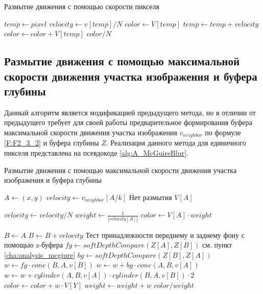 \begin{breakablealgorithm}
    \caption{Размытие движения с помощью скорости пикселя} \label{alg:A_PerPixelBlur}
    \begin{algorithmic}[1]
            \State $temp \leftarrow pixel$
            \State $velocity \leftarrow v[temp] / N$
            \State $color \leftarrow V[temp]$
            \ForAll{$i \in [0; N)$}
                \State $temp \leftarrow temp + velocity$
                \State $color \leftarrow color + V[temp]$
            \EndFor
            \State \Return $color / N$
        \EndFunction
\end{algorithmic}
\end{breakablealgorithm}




\subsection{Размытие движения с помощью максимальной скорости движения участка изображения и буфера глубины}

Данный алгоритм является модификацией предыдущего метода, но в отличии от предыдущего требует для своей работы предварительное формирования буфера максимальной скорости движения участка изображения $v_{neighbor}$ по формуле \eqref{F:F2_3_2} и буфера глубины $Z$. Реализация данного метода для единичного пикселя представлена на псевдокоде \ref{alg:A_McGuireBlur}.

\begin{breakablealgorithm}
\caption{Размытие движения с помощью максимальной скорости движения участка изображения и буфера глубины} \label{alg:A_McGuireBlur}
\begin{algorithmic}[1]
        \State $A \leftarrow (x,y)$
        \State $velocity \leftarrow v_{neighbor}[A/k]$
         \Comment Нет размытия 
            \State \Return $V[A]$
        \EndIf
        
        \State $velocity \leftarrow velocity / N$
        \State $weight \leftarrow \frac{1}{|velocity[A]|}$
        \State $color \leftarrow V[A] \cdot weight$
        
        \State $B \leftarrow A$
        \ForAll{$i \in [0; N)$}
            \State $B \leftarrow B + velocity$
            \Statex \Comment Тест принадлежности переднему и заднему фону с помощью z-буфера
            \State $fg \leftarrow softDepthCompare(Z[A],Z[B])$  \Comment см. пункт \ref{cha:analysis_mcgiure} 
            \State $bg \leftarrow softDepthCompare(Z[B],Z[A])$
            \Statex
            \State $w \leftarrow  fg \cdot cone(B,A,v[B])$
            \State $w \leftarrow  w + bg \cdot cone(A,B,v[A])$
            \State $w \leftarrow  w + cylinder(A,B,v[A]) \cdot  cylinder(B,A,v[B]) \cdot 2$
            \Statex
            \State $color \leftarrow color + w \cdot V[Y]$
            \State $weight \leftarrow weight + w$
        \EndFor
        \State \Return $color / weight$
    \EndFunction        
\end{algorithmic}
\end{breakablealgorithm}



